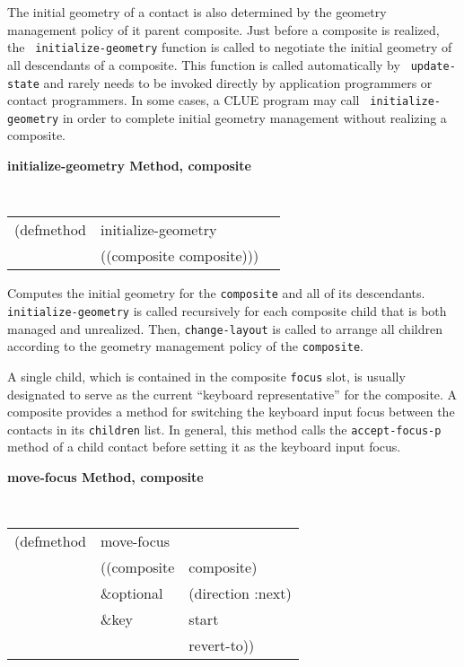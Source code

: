 The initial geometry of a contact is also determined by the geometry management
policy of it parent composite.  Just before a composite is realized, the {\tt
initialize-geometry} function is called to negotiate the initial geometry of all
descendants of a composite.  This function is called automatically by {\tt
update-state}
and rarely needs to be invoked directly by application programmers
or contact programmers.  In some cases, a CLUE program may call {\tt
initialize-geometry} in order to complete initial geometry management without
realizing a composite.

{\samepage
{\large {\bf initialize-geometry \hfill Method, composite}}
\begin{flushright} \parbox[t]{6.125in}{
\tt
\begin{tabular}{lll}
\raggedright
(defmethod & initialize-geometry & \\
           & ((composite  composite)))
\end{tabular}
\rm

}\end{flushright}}

\begin{flushright} \parbox[t]{6.125in}{
Computes the initial geometry for the {\tt composite} and all of its
descendants. {\tt initialize-geometry} is called recursively for each composite
child that
is both managed and unrealized. Then, {\tt change-layout} is called to arrange
all children according to the geometry management policy of the {\tt composite}.

}\end{flushright}

 
{\samepage
{}
A single child, which is contained in the
composite {\tt focus} slot, is usually designated to serve as the current
``keyboard representative'' for the composite. 
A composite provides a method for switching the keyboard input focus
between
the contacts in its {\tt children} list. In general, this method calls the
{\tt accept-focus-p}
method of a child contact before setting it as the keyboard
input focus.
}

{\samepage
{\large {\bf move-focus \hfill Method, composite}}
\begin{flushright} \parbox[t]{6.125in}{
\tt
\begin{tabular}{lll}
\raggedright
(defmethod & move-focus \\
           & ((composite & composite)\\
           & \&optional & (direction :next) \\
           & \&key           & start\\
           & & revert-to))
\end{tabular}
\rm

}\end{flushright}}

